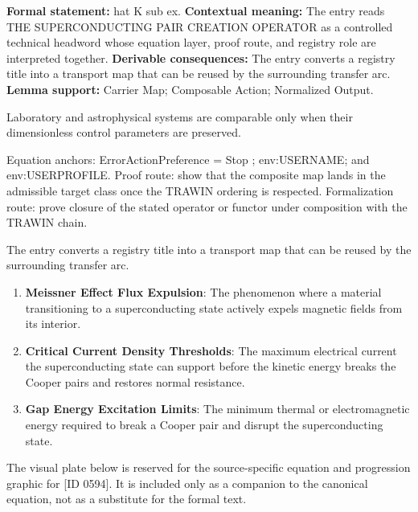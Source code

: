 \begingroup\footnotesize\setlength{\emergencystretch}{3em}\sloppy
\textbf{Formal statement:} hat K sub ex. \textbf{Contextual meaning:} The entry reads THE SUPERCONDUCTING PAIR CREATION OPERATOR as a controlled technical headword whose equation layer, proof route, and registry role are interpreted together. \textbf{Derivable consequences:} The entry converts a registry title into a transport map that can be reused by the surrounding transfer arc. \textbf{Lemma support:} Carrier Map; Composable Action; Normalized Output.\par
\endgroup

Laboratory and astrophysical systems are comparable only when their dimensionless control parameters are preserved.

Equation anchors: ErrorActionPreference = Stop ; env:USERNAME; and env:USERPROFILE. Proof route: show that the composite map lands in the admissible target class once the TRAWIN ordering is respected. Formalization route: prove closure of the stated operator or functor under composition with the TRAWIN chain.

The entry converts a registry title into a transport map that can be reused by the surrounding transfer arc.
\endgroup

\begin{enumerate}[leftmargin=1.6em,itemsep=6pt,topsep=4pt]
\item \textbf{Meissner Effect Flux Expulsion}: The phenomenon where a material transitioning to a superconducting state actively expels magnetic fields from its interior.
\item \textbf{Critical Current Density Thresholds}: The maximum electrical current the superconducting state can support before the kinetic energy breaks the Cooper pairs and restores normal resistance.
\item \textbf{Gap Energy Excitation Limits}: The minimum thermal or electromagnetic energy required to break a Cooper pair and disrupt the superconducting state.
\end{enumerate}

\begingroup\footnotesize\sloppy
The visual plate below is reserved for the source-specific equation and progression graphic for [ID 0594]. It is included only as a companion to the canonical equation, not as a substitute for the formal text.
\par\endgroup
\ifTZPDarkEdition
{}
\fi

